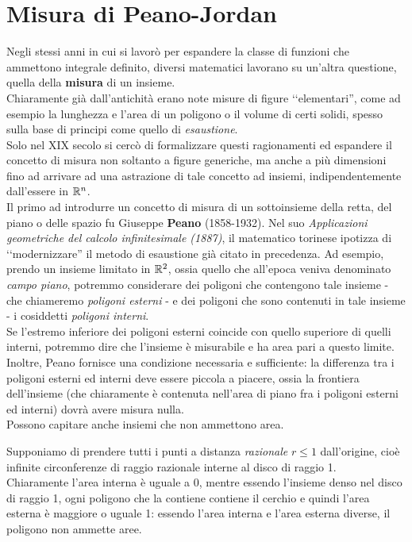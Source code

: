 \section{Misura di Peano-Jordan}
Negli stessi anni in cui si lavorò per espandere la classe di funzioni che ammettono integrale definito, diversi matematici lavorano su un'altra questione, quella della \textbf{misura} di un insieme.\\
Chiaramente già dall'antichità erano note misure di figure ‘‘elementari'', come ad esempio la lunghezza e l'area di un poligono o il volume di certi solidi, spesso sulla base di principi come quello di \textit{esaustione}.\\
Solo nel XIX secolo si cercò di formalizzare questi ragionamenti ed espandere il concetto di misura non soltanto a figure generiche, ma anche a più dimensioni fino ad arrivare ad una astrazione di tale concetto ad insiemi, indipendentemente dall'essere in $\mathbb{R}^n$.\\
Il primo ad introdurre un concetto di misura di un sottoinsieme della retta, del piano o delle spazio fu Giuseppe \textbf{Peano} (1858-1932). Nel suo \textit{Applicazioni geometriche del
calcolo infinitesimale (1887)}, il matematico torinese ipotizza di ‘‘modernizzare'' il metodo di esaustione già citato in precedenza.
Ad esempio, prendo un insieme limitato in $\mathbb{R}^2$, ossia quello che all'epoca veniva denominato \textit{campo piano}, potremmo considerare dei poligoni che contengono tale insieme - che chiameremo \textit{poligoni esterni} - e dei poligoni che sono contenuti in tale insieme - i cosiddetti \textit{poligoni interni}.\\
Se l'estremo inferiore dei poligoni esterni coincide con quello superiore di quelli interni, potremmo dire che l'insieme è misurabile e ha area pari a questo limite.
Inoltre, Peano fornisce una condizione necessaria e sufficiente: la differenza tra i poligoni esterni ed interni deve essere piccola a piacere, ossia la frontiera dell'insieme (che chiaramente è contenuta nell'area di piano fra i poligoni esterni ed interni) dovrà avere misura nulla.\\
Possono capitare anche insiemi che non ammettono area. 
\begin{example}
	Supponiamo di prendere tutti i punti a distanza \textit{razionale} $r\leq 1$ dall'origine, cioè infinite circonferenze di raggio razionale interne al disco di raggio 1.\\
	Chiaramente l'area interna è uguale a 0, mentre essendo l'insieme denso nel disco di raggio 1, ogni poligono che la contiene contiene il cerchio e quindi l'area esterna è maggiore o uguale 1: essendo l'area interna e l'area esterna diverse, il poligono non ammette aree.
\end{example}
